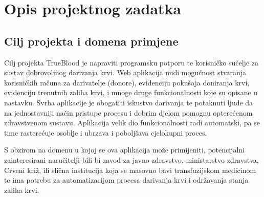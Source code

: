 \chapter{Opis projektnog zadatka}
	
	

		\section{Cilj projekta i domena primjene}
        \par{Cilj projekta TrueBlood je napraviti programsku potporu te korisničko sučelje za sustav dobrovoljnog darivanja krvi. Web aplikacija nudi mogućnost stvaranja korisničkih računa za darivatelje (donore), evidenciju pokušaja doniranja krvi, evidenciju trenutnih zaliha krvi, i mnoge druge funkcionalnosti koje su opisane u nastavku. Svrha aplikacije je obogatiti iskustvo darivanja te potaknuti ljude da na jednostavniji način pristupe procesu i dobrim djelom pomognu opterećenom zdravstvenom sustavu. Aplikacija velik dio funkcionalnosti radi automatski, pa se time rasterećuje osoblje i ubrzava i poboljšava cjelokupni proces.}
        \par{
        S obzirom na domenu u kojoj se ova aplikacija može primijeniti, potencijalni zainteresirani naručitelji bili bi zavod za javno zdravstvo, ministarstvo zdravstva, Crveni križ, ili slična institucija koja se masovno bavi transfuzijskom medicinom te ima potrebu za automatizacijom procesa darivanja krvi i održavanja stanja zaliha krvi.
        }
        

